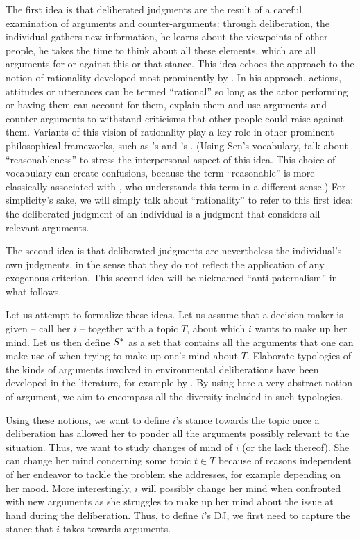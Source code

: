\documentclass[version=3.21, pagesize, twoside=off, bibliography=totoc, DIV=calc, fontsize=12pt, a4paper, french, english]{scrartcl}
\begin{document}
The first idea is that deliberated judgments are the result of a careful examination of arguments and counter-arguments: through deliberation, the individual gathers new information, he learns about the viewpoints of other people, he takes the time to think about all these elements, which are all arguments for or against this or that stance. 
This idea echoes the approach to the notion of rationality developed most prominently by \citet{habermas_theorie_1981}. 
In his approach, actions, attitudes or utterances can be termed “rational” so long as the actor performing or having them can account for them, explain them and use arguments and counter-arguments to withstand criticisms that other people could raise against them. 
Variants of this vision of rationality play a key role in other prominent philosophical frameworks, such as \citeauthor{scanlon_what_2000}’s \citeyearpar{scanlon_what_2000} and \citeauthor{sen_idea_2009}’s \citeyearpar{sen_idea_2009}. 
(Using Sen's vocabulary, \citeauthor{bartkowski_beyond_2018} talk about ``reasonableness'' to stress the interpersonal aspect of this idea. 
This choice of vocabulary can create confusions, because the term ``reasonable'' is more classically associated with \citet{rawls_political_2005}, who understands this term in a different sense.) 
For simplicity's sake, we will simply talk about ``rationality'' to refer to this first idea: the deliberated judgment of an individual is a judgment that considers all relevant arguments.

The second idea is that deliberated judgments are nevertheless the individual's own judgments, in the sense that they do not reflect the application of any exogenous criterion. 
This second idea will be nicknamed ``anti-paternalism'' in what follows. 

Let us attempt to formalize these ideas. 
Let us assume that a decision-maker is given -- call her $i$ -- together with a topic $T$, about which $i$ wants to make up her mind. 
Let us then define $S^*$ as a set that contains all the arguments that one can make use of when trying to make up one’s mind about $T$.
Elaborate typologies of the kinds of arguments involved in environmental deliberations have been developed in the literature, for example by \citet{chateauraynaud_contrainte_2007}. 
By using here a very abstract notion of argument, we aim to encompass all the diversity included in such typologies. 

Using these notions, we want to define $i$’s stance towards the topic once a deliberation has allowed her to ponder all the arguments possibly relevant to the situation. 
Thus, we want to study changes of mind of $i$ (or the lack thereof).
She can change her mind concerning some topic $t \in T$ because of reasons independent of her endeavor to tackle the problem she addresses, for example depending on her mood. 
More interestingly, $i$ will possibly change her mind when confronted with new arguments as she struggles to make up her mind about the issue at hand during the deliberation.
Thus, to define $i$’s \ac{DJ}, we first need to capture the stance that $i$ takes towards arguments. 
\end{document}
